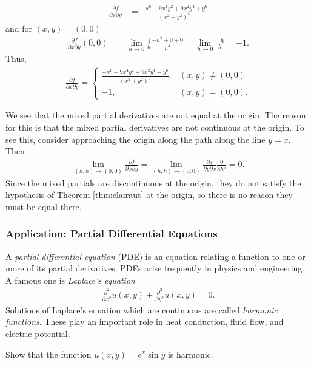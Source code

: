 \documentclass[12pt,letterpaper,reqno]{article}
\numberwithin{equation}{section}
\begin{document}
{\begin{example}
\begin{align*}
	\frac{\partial f}{\partial x \partial y}&=\frac{-x^6-9x^4y^2+9x^2y^4+y^6}{(x^2+y^2)^3}
\end{align*} 
and for $(x,y)=(0,0)$
\begin{align*}
	\frac{\partial f}{\partial x \partial y}(0,0)&=\lim_{h \to 0}\frac{1}{h}\frac{-h^5+0+0}{h^4}=\lim_{h \to 0}\frac{-h}{h}=-1. 
\end{align*}
Thus,
\begin{align*}
	\frac{\partial f}{\partial x \partial y}=\begin{cases}
		\frac{-x^6-9x^4y^2+9x^2y^4+y^6}{(x^2+y^2)^3}, &(x,y) \neq (0,0) \\
		-1, &(x,y)=(0,0).
	\end{cases}
\end{align*}

We see that the mixed partial derivatives are not equal at the origin. The reason for this is that the mixed partial derivatives are not continuous at the origin. To see this, consider approaching the origin along the path along the line $y=x$. Then
\begin{align*}
	\lim_{(h,h) \to (0,0)}\frac{\partial f}{\partial x \partial y}=\lim_{(h,h) \to (0,0)}\frac{\partial f}{\partial y \partial x}\frac{0}{8h^6}=0.
\end{align*}
Since the mixed partials are discontinuous at the origin, they do not satisfy the hypothesis of Theorem \ref{thm:clairaut} at the origin, so there is no reason they must be equal there.
\end{example}


\subsubsection{Application: Partial Differential Equations}
A \emph{partial differential equation} (PDE) is an equation relating a function to one or more of its partial derivatives. PDEs arise frequently in physics and engineering. A famous one is \emph{Laplace's equation}
\begin{align*}
	\frac{\partial^2}{\partial x^2}u(x,y)+\frac{\partial^2}{\partial y^2}u(x,y)=0.
\end{align*}
Solutions of Laplace's equation which are continuous are called \emph{harmonic functions}. These play an important role in heat conduction, fluid flow, and electric potential.

\begin{exercise}
Show that the function $u(x,y)=e^x\sin y$ is harmonic.	
\end{exercise}

}
\end{document}
